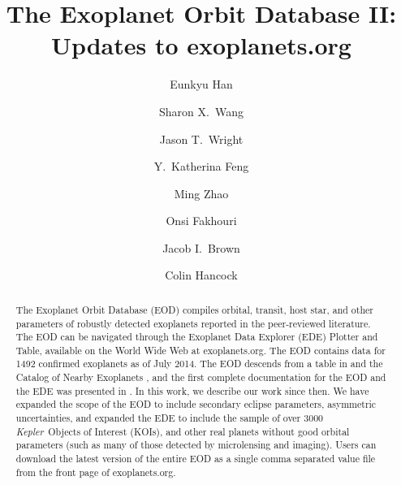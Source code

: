 \documentclass[11pt,preprint]{aastex}
\def\kepler{\textit{Kepler}}
\begin{document}
\begin{CJK*}{UTF8}{gbsn}

\title{The Exoplanet Orbit Database \textsc{II}: Updates to
  exoplanets.org}

\author{Eunkyu Han}
\author{Sharon X.\ Wang}
\author{Jason T.\ Wright}
\author{Y.\ Katherina Feng}
\author{Ming Zhao}
\author{Onsi Fakhouri}
\author{Jacob I.\ Brown}
\author{Colin Hancock}


\begin{abstract}

The Exoplanet Orbit Database (EOD) compiles orbital, transit, host
star, and other parameters of robustly detected exoplanets reported in
the peer-reviewed literature. The EOD can be navigated through the
Exoplanet Data Explorer (EDE) Plotter and Table, available on the
World Wide Web at exoplanets.org. The EOD contains data for 1492
confirmed exoplanets as of July 2014.  The EOD descends from a table
in \citet{Butler2002} and the Catalog of Nearby Exoplanets
\citep{Butler2006}, and the first complete documentation for the EOD
and the EDE was presented in \cite{Wright2011}. In this work, we
describe our work since then.  We have expanded the scope of the EOD
to include secondary eclipse parameters, asymmetric uncertainties, and
expanded the EDE to include the sample of over 3000 \kepler\ Objects
of Interest (KOIs), and other real planets without good orbital
parameters (such as many of those detected by microlensing and
imaging). Users can download the latest version of the entire EOD as a
single comma separated value file from the front page of
exoplanets.org.

\end{abstract}  


\end{CJK*}
\end{document}
